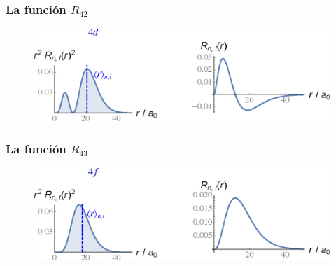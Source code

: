 \begin{frame}
\frametitle{La función $R_{42}$}
\begin{figure}
   \centering
   \includegraphics[scale=0.67]{Imagenes/Plot_Funcion_Radial_42.eps}
\end{figure}
\end{frame}
\begin{frame}
\frametitle{La función $R_{43}$}
\begin{figure}
   \centering
   \includegraphics[scale=0.67]{Imagenes/Plot_Funcion_Radial_43.eps}
\end{figure}
\end{frame}
